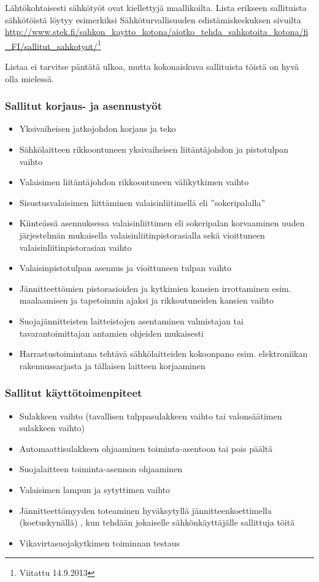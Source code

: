 \begin{frame}

Lähtökohtaisesti sähkötyöt ovat kiellettyjä maallikoilta. Lista erikseen sallituista sähkötöistä löytyy esimerkiksi Sähköturvallisuuden edistämiskeskuksen sivuilta
\url{http://www.stek.fi/sahkon_kaytto_kotona/aiotko_tehda_sahkotoita_kotona/fi_FI/sallitut_sahkotyot/}\footnote{Viitattu 14.9.2013}

Listaa ei tarvitse päntätä ulkoa, mutta kokonaiskuva sallituista töistä on hyvä olla mielessä.
\end{frame}


\begin{frame}
\frametitle{Sallitut korjaus- ja asennustyöt}
\begin{itemize}
\item    Yksivaiheisen jatkojohdon korjaus ja teko
\item    Sähkölaitteen rikkoontuneen yksivaiheisen liitäntäjohdon ja pistotulpan vaihto
\item    Valaisimen liitäntäjohdon rikkoontuneen välikytkimen vaihto
\item    Sisustusvalaisimen liittäminen valaisinliitimellä eli ”sokeripalalla”
\item    Kiinteässä asennuksessa valaisinliittimen eli sokeripalan korvaaminen uuden järjestelmän mukaisella valaisinliitinpistorasialla sekä vioittuneen valaisinliitinpistorasian vaihto
\item    Valaisinpistotulpan asennus ja vioittuneen tulpan vaihto
\item    Jännitteettömien pistorasioiden ja kytkimien kansien irrottaminen esim. maalaamisen ja tapetoinnin ajaksi ja rikkoutuneiden kansien vaihto
\item    Suojajännitteisten laitteistojen asentaminen valmistajan tai tavarantoimittajan antamien ohjeiden mukaisesti
\item    Harrastustoimintana tehtävä sähkölaitteiden kokoonpano esim. elektroniikan rakennussarjasta ja tällaisen laitteen korjaaminen
\end{itemize}
\end{frame}



\begin{frame}
\frametitle{Sallitut käyttötoimenpiteet}
\begin{itemize}
\item    Sulakkeen vaihto (tavallisen tulppasulakkeen vaihto tai valonsäätimen sulakkeen vaihto)
\item    Automaattisulakkeen ohjaaminen toiminta-asentoon tai pois päältä
\item    Suojalaitteen toiminta-asennon ohjaaminen
\item    Valaisimen lampun ja sytyttimen vaihto
\item    Jännitteettömyyden toteaminen hyväksytyllä jännitteenkoettimella (koetuskynällä) , kun tehdään jokaiselle sähkönkäyttäjälle sallittuja töitä
\item Vikavirtasuojakytkimen toiminnan testaus
\end{itemize}
\end{frame}

